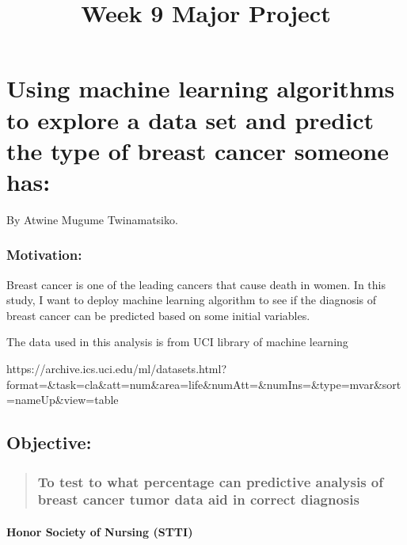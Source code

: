 \documentclass[11pt]{article}
\title{Week 9 Major Project}
\begin{document}
    
    
    \maketitle
    
    

    
    \section{Using machine learning algorithms to explore a data set and
predict the type of breast cancer someone
has:}\label{using-machine-learning-algorithms-to-explore-a-data-set-and-predict-the-type-of-breast-cancer-someone-has}

    By Atwine Mugume Twinamatsiko.

    \subsubsection{Motivation:}\label{motivation}

Breast cancer is one of the leading cancers that cause death in women.
In this study, I want to deploy machine learning algorithm to see if the
diagnosis of breast cancer can be predicted based on some initial
variables.

    The data used in this analysis is from UCI library of machine learning

https://archive.ics.uci.edu/ml/datasets.html?format=\&task=cla\&att=num\&area=life\&numAtt=\&numIns=\&type=mvar\&sort=nameUp\&view=table

    \subsection{Objective:}\label{objective}

\begin{quote}
\subsubsection{To test to what percentage can predictive analysis of
breast cancer tumor data aid in correct
diagnosis}\label{to-test-to-what-percentage-can-predictive-analysis-of-breast-cancer-tumor-data-aid-in-correct-diagnosis}
\end{quote}

    \paragraph{Honor Society of Nursing
(STTI)}\label{honor-society-of-nursing-stti}
\end{document}
